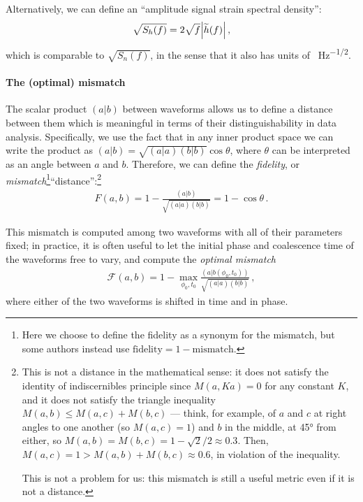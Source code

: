 \documentclass[main.tex]{subfiles}
\begin{document}
Alternatively, we can define an ``amplitude signal strain spectral density'': 
%
\begin{align}
\sqrt{S_h (f)} = 2 \sqrt{f} \abs{\widetilde{h}(f)}
\,,
\end{align}
%
which is comparable to \(\sqrt{S_n(f)}\), in the sense that it also has units of \SI{}{Hz^{-1/2}}.

\paragraph{The (optimal) mismatch}

The scalar product \((a|b)\) between waveforms allows us to define a distance between them which is meaningful in terms of their distinguishability in data analysis.
Specifically, we use the fact that in any inner product space we can write the product as \((a|b) = \sqrt{(a|a) (b|b)} \cos \theta \), where \(\theta \) can be interpreted as an angle between \(a\) and \(b\). 
Therefore, we can define the \emph{fidelity}, or \emph{mismatch}\footnote{Here we choose to define the fidelity as a synonym for the mismatch, but some authors instead use \(\text{fidelity} = 1 - \text{mismatch}\).}``distance'':\footnote{This is not a distance in the mathematical sense: it does not satisfy the identity of indiscernibles principle since \(M(a, Ka) = 0\) for any constant \(K\), and it does not satisfy the triangle inequality \(M(a, b) \leq M(a, c) + M(b, c)\) --- think, for example, of \(a\) and \(c\) at right angles to one another (so \(M(a, c) = 1\)) and \(b\) in the middle, at 45° from either, so \(M(a, b) = M(b, c) = 1 - \sqrt{2} / 2 \approx 0.3\). Then, \(M(a,c) = 1 > M(a, b) + M(b, c) \approx 0.6\), in violation of the inequality. 

This is not a problem for us: this mismatch is still a useful metric even if it is not a distance. }
%
\begin{align}
F(a, b) = 1 - \frac{(a|b)}{\sqrt{(a|a) (b|b)}} = 1 - \cos \theta 
\,.
\end{align}

This mismatch is computed among two waveforms with all of their parameters fixed; in practice, it is often useful to let the initial phase and coalescence time of the waveforms free to vary, and compute the \emph{optimal mismatch}
%
\begin{align}
\mathcal{F}(a, b) = 1 - \max_{\phi_0 , t_0 } \frac{(a|b(\phi_0, t_0 ))}{\sqrt{(a|a)(b|b)}}
\,,
\end{align}
%
where either of the two waveforms is shifted in time and in phase.
\end{document}
